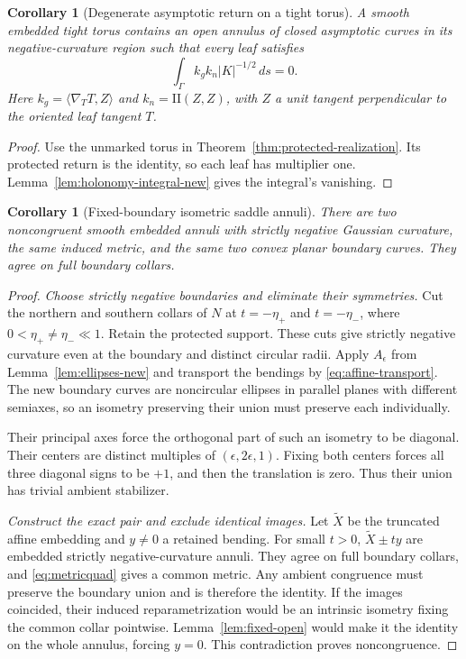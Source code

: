 \documentclass[11pt]{amsart}
\newtheorem{corollary}[theorem]{Corollary}
\theoremstyle{definition}
\theoremstyle{remark}
\newcommand{\II}{\mathrm{II}}\newcommand{\Gmap}{\mathcal G}
\numberwithin{equation}{section}
\begin{document}
\begin{corollary}[Degenerate asymptotic return on a tight torus]
\label{cor:HK-degenerate}
A smooth embedded tight torus contains an open annulus of closed
asymptotic curves in its negative-curvature region such that every leaf
satisfies
\[
 \int_\Gamma k_gk_n|K|^{-1/2}\,ds=0.
\]
Here $k_g=\langle\nabla_TT,Z\rangle$ and $k_n=\II(Z,Z)$, with $Z$
a unit tangent perpendicular to the oriented leaf tangent $T$.
\end{corollary}
\begin{proof}
Use the unmarked torus in Theorem~\ref{thm:protected-realization}.
Its protected return is the identity, so each leaf has multiplier one.
Lemma~\ref{lem:holonomy-integral-new} gives the integral's vanishing.
\end{proof}

\begin{corollary}[Fixed-boundary isometric saddle annuli]
\label{cor:fixed-boundary-annuli}
There are two noncongruent smooth embedded annuli with strictly negative
Gaussian curvature, the same induced metric, and the same two convex
planar boundary curves. They agree on full boundary collars.
\end{corollary}
\begin{proof}
\emph{Choose strictly negative boundaries and eliminate their symmetries.}
Cut the northern and southern collars of $N$ at $t=-\eta_+$ and
$t=-\eta_-$, where $0<\eta_+\ne\eta_-\ll1$. Retain the protected
support. These cuts give strictly negative curvature even at the boundary
and distinct circular radii. Apply $A_\epsilon$ from
Lemma~\ref{lem:ellipses-new} and transport the bendings by
\eqref{eq:affine-transport}. The new boundary curves are noncircular
ellipses in parallel planes with different semiaxes, so an isometry
preserving their union must preserve each individually.

Their principal axes force the orthogonal part of such an isometry to
be diagonal. Their centers are distinct multiples of
$(\epsilon,2\epsilon,1)$. Fixing both centers forces all three diagonal
signs to be $+1$, and then the translation is zero. Thus their union
has trivial ambient stabilizer.

\emph{Construct the exact pair and exclude identical images.}
Let $\widetilde X$ be the truncated affine embedding and $y\ne0$ a
retained bending. For small $t>0$, $\widetilde X\pm ty$ are embedded
strictly negative-curvature annuli. They agree on full boundary collars,
and \eqref{eq:metricquad} gives a common metric.
Any ambient congruence must preserve the boundary union and is therefore
the identity. If the images coincided, their induced reparametrization
would be an intrinsic isometry fixing the common collar pointwise.
Lemma~\ref{lem:fixed-open} would make it the identity on the whole annulus,
forcing $y=0$. This contradiction proves noncongruence.
\end{proof}
\end{document}
